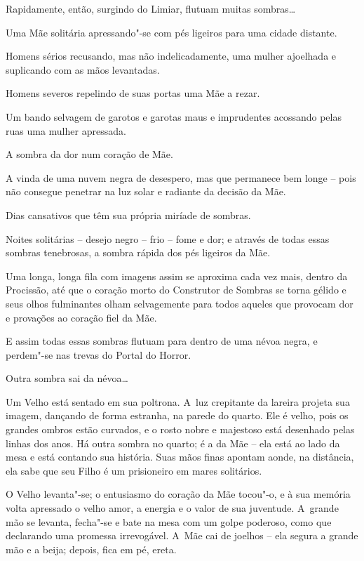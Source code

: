 \smallskip
Rapidamente, então, surgindo do Limiar, flutuam muitas sombras…

\smallskip
Uma Mãe solitária apressando"-se com pés ligeiros para uma cidade
distante.

\smallskip
Homens sérios recusando, mas não indelicadamente, uma mulher ajoelhada e
suplicando com as mãos levantadas.

\smallskip
Homens severos repelindo de suas portas uma Mãe a rezar.

\smallskip
Um bando selvagem de garotos e garotas maus e imprudentes acossando
pelas ruas uma mulher apressada.

\smallskip
A sombra da dor num coração de Mãe.

\smallskip
A vinda de uma nuvem negra de desespero, mas que permanece bem longe --
pois não consegue penetrar na luz solar e radiante da decisão da Mãe.

\smallskip
Dias cansativos que têm sua própria miríade de sombras.

\smallskip
Noites solitárias -- desejo negro -- frio -- fome e dor; e através de
todas essas sombras tenebrosas, a sombra rápida dos pés ligeiros da Mãe.

\smallskip
Uma longa, longa fila com imagens assim se aproxima cada vez mais,
dentro da Procissão, até que o coração morto do Construtor de Sombras se
torna gélido e seus olhos fulminantes olham selvagemente para todos
aqueles que provocam dor e provações ao coração fiel da Mãe.

E assim todas essas sombras flutuam para dentro de uma névoa negra, e
perdem"-se nas trevas do Portal do Horror.

\smallskip
Outra sombra sai da névoa…

Um Velho está sentado em sua poltrona. A~luz crepitante da lareira
projeta sua imagem, dançando de forma estranha, na parede do quarto. Ele
é velho, pois os grandes ombros estão curvados, e o rosto nobre e
majestoso está desenhado pelas linhas dos anos. Há outra sombra no
quarto; é a da Mãe -- ela está ao lado da mesa e está contando sua
história. Suas mãos finas apontam aonde, na distância, ela sabe que seu
Filho é um prisioneiro em mares solitários.

O Velho levanta"-se; o entusiasmo do coração da Mãe tocou"-o, e à sua
memória volta apressado o velho amor, a energia e o valor de sua
juventude. A~grande mão se levanta, fecha"-se e bate na mesa com um golpe
poderoso, como que declarando uma promessa irrevogável. A~Mãe cai de
joelhos -- ela segura a grande mão e a beija; depois, fica em pé, ereta.

